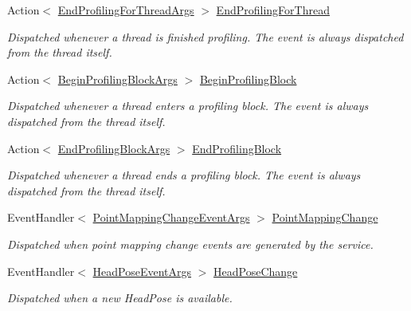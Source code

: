 \begin{DoxyCompactItemize}
Action$<$ \mbox{\hyperlink{struct_leap_1_1_end_profiling_for_thread_args}{End\+Profiling\+For\+Thread\+Args}} $>$ \mbox{\hyperlink{class_leap_1_1_controller_a29354296ef9a6de70e2ce06db251c16b}{End\+Profiling\+For\+Thread}}
\begin{DoxyCompactList}\small\item\em Dispatched whenever a thread is finished profiling. The event is always dispatched from the thread itself. \end{DoxyCompactList}\item 
Action$<$ \mbox{\hyperlink{struct_leap_1_1_begin_profiling_block_args}{Begin\+Profiling\+Block\+Args}} $>$ \mbox{\hyperlink{class_leap_1_1_controller_a6195a732f3ce5a94f41bda37fecca548}{Begin\+Profiling\+Block}}
\begin{DoxyCompactList}\small\item\em Dispatched whenever a thread enters a profiling block. The event is always dispatched from the thread itself. \end{DoxyCompactList}\item 
Action$<$ \mbox{\hyperlink{struct_leap_1_1_end_profiling_block_args}{End\+Profiling\+Block\+Args}} $>$ \mbox{\hyperlink{class_leap_1_1_controller_a47514a57487eb7543323ef7ca8f197e3}{End\+Profiling\+Block}}
\begin{DoxyCompactList}\small\item\em Dispatched whenever a thread ends a profiling block. The event is always dispatched from the thread itself. \end{DoxyCompactList}\item 
Event\+Handler$<$ \mbox{\hyperlink{class_leap_1_1_point_mapping_change_event_args}{Point\+Mapping\+Change\+Event\+Args}} $>$ \mbox{\hyperlink{class_leap_1_1_controller_a148e5d3bcc1f4e4d3c972d7482f1d1ab}{Point\+Mapping\+Change}}
\begin{DoxyCompactList}\small\item\em Dispatched when point mapping change events are generated by the service. \end{DoxyCompactList}\item 
Event\+Handler$<$ \mbox{\hyperlink{class_leap_1_1_head_pose_event_args}{Head\+Pose\+Event\+Args}} $>$ \mbox{\hyperlink{class_leap_1_1_controller_a8f102727031288a8b1c8f2583c31d161}{Head\+Pose\+Change}}
\begin{DoxyCompactList}\small\item\em Dispatched when a new Head\+Pose is available. \end{DoxyCompactList}\item 

\end{DoxyCompactItemize}
